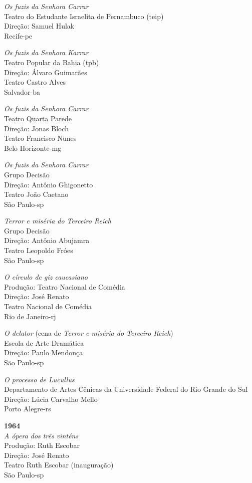 {{\it Os fuzis da Senhora Carrar}\\
Teatro do Estudante Israelita de Pernambuco ({\sc teip})\\
Direção: Samuel Hulak\\
Recife-{\sc pe}

{\it Os fuzis da Senhora Karrar}\\
Teatro Popular da Bahia ({\sc tpb})\\
Direção: Álvaro Guimarães\\
Teatro Castro Alves\\
Salvador-{\sc ba}

{\it Os fuzis da Senhora Carrar}\\
Teatro Quarta Parede\\
Direção: Jonas Bloch\\
Teatro Francisco Nunes\\
Belo Horizonte-{\sc mg}

{\it Os fuzis da Senhora Carrar}\\
Grupo Decisão\\
Direção: Antônio Ghigonetto\\
Teatro João Caetano\\
São Paulo-{\sc sp}

{\it Terror e miséria do Terceiro Reich}\\
Grupo Decisão\\
Direção: Antônio Abujamra\\
Teatro Leopoldo Fróes\\
São Paulo-{\sc sp}

{\it O círculo de giz caucasiano}\\
Produção: Teatro Nacional de Comédia\\
Direção: José Renato\\
Teatro Nacional de Comédia\\
Rio de Janeiro-{\sc rj}

{\it O delator} (cena de {\it Terror e miséria do Terceiro Reich})\\
Escola de Arte Dramática\\
Direção: Paulo Mendonça\\
São Paulo-{\sc sp}

{\it O processo de Lucullus}\\
Departamento de Artes Cênicas da Universidade Federal do Rio Grande do
Sul\\
Direção: Lúcia Carvalho Mello\\
Porto Alegre-{\sc rs}

\item{\bf 1964}\\
{\it A ópera dos três vinténs}\\
Produção: Ruth Escobar\\
Direção: José Renato\\
Teatro Ruth Escobar (inauguração)\\
São Paulo-{\sc sp}

}
